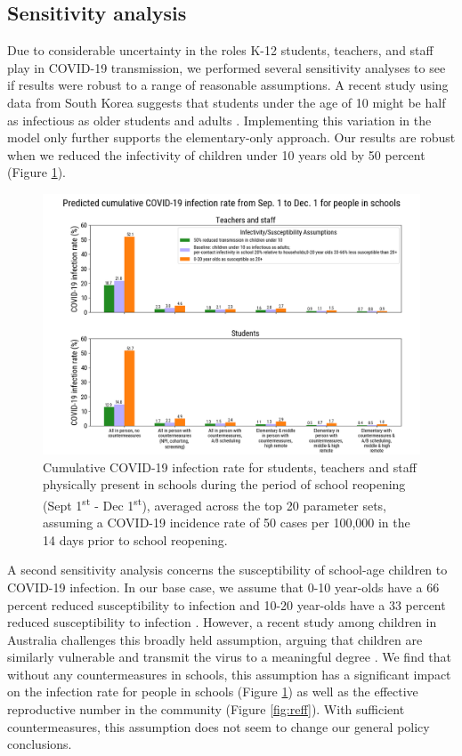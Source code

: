 \documentclass[preprint,12pt]{elsarticle}
\begin{document}
\subsection{Sensitivity analysis}

Due to considerable uncertainty in the roles K-12 students, teachers, and staff play in COVID-19 transmission, we performed several sensitivity analyses to see if results were robust to a range of reasonable assumptions. A recent study using data from South Korea suggests that students under the age of 10 might be half as infectious as older students and adults \cite{park_early_nodate}. Implementing this variation in the model only further supports the elementary-only approach. Our results are robust when we reduced the infectivity of children under 10 years old by 50 percent (Figure \ref{fig:attack_rate_sens}).

\begin{figure}[h]
    \centering
    \includegraphics[scale=0.4]{attack_rate_sens_2020-08-13.png}
    \caption{Cumulative COVID-19 infection rate for students, teachers and staff physically present in schools during the period of school reopening (Sept 1\textsuperscript{st} - Dec 1\textsuperscript{st}), averaged across the top 20 parameter sets, assuming a COVID-19 incidence rate of 50 cases per 100,000 in the 14 days prior to school reopening.}
    \label{fig:attack_rate_sens}
\end{figure}

A second sensitivity analysis concerns the susceptibility of school-age children to COVID-19 infection. In our base case, we assume that 0-10 year-olds have a 66 percent reduced susceptibility to infection and 10-20 year-olds have a 33 percent reduced susceptibility to infection \cite{zhang_changes_2020}. However, a recent study among children in Australia challenges this broadly held assumption, arguing that children are similarly vulnerable and transmit the virus to a meaningful degree \cite{hyde_covid-19_2020}. We find that without any countermeasures in schools, this assumption has a significant impact on the infection rate for people in schools (Figure \ref{fig:attack_rate_sens}) as well as the effective reproductive number in the community (Figure \ref{fig:reff}). With sufficient countermeasures, this assumption does not seem to change our general policy conclusions.
\end{document}
